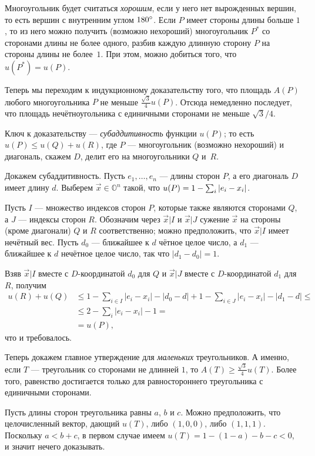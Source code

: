 Многоугольник будет считаться \emph{хорошим}, если у него нет вырожденных вершин,
то есть вершин с внутренним углом $180\degree$.
Если $P$ имеет стороны длины больше $1$, то из него можно получить (возможно нехороший) многоугольник $P^*$ со сторонами длины не более одного, разбив каждую длинную сторону $P$ на стороны длины не более~$1$.
При этом, можно добиться того, что $u(P^*)=u(P)$.

Теперь мы переходим к индукционному доказательству того, что площадь $A(P)$ любого многоугольника $P$ не меньше $\tfrac{\sqrt{3}}{4}u(P)$.
Отсюда немедленно последует, что площадь нечётноугольника с единичными сторонами не меньше  $\sqrt{3}/4$.

Ключ к доказательству --- \emph{субаддитивность} функции $u(P)$;
то есть $u(P)\leqslant u(Q)+u(R)$, где $P$ --- многоугольник (возможно нехороший) и диагональ, скажем $D$, делит его на многоугольники $Q$ и~$R$.

Докажем субаддитивность.
Пусть  $e_1,\dots,e_n$ --- длины сторон $P$, а его диагональ $D$ имеет длину $d$. 
Выберем $\vec x\in\mathbb{O}^n$ такой, что $u(P)\z=1-\sum_i |e_i-x_i|$.

Пусть $I$ --- множество индексов сторон $P$, которые также являются сторонами $Q$, а $J$ --- индексы сторон $R$.
Обозначим через $\vec x|I$ и $\vec x|J$ сужение $\vec x$ на стороны (кроме диагонали) $Q$ и $R$ соответственно;
можно предположить, что $\vec x|I$ имеет нечётный вес.
Пусть $d_0$ --- ближайшее к $d$ чётное целое число, а $d_1$ --- ближайшее к $d$ нечётное целое число, так что $|d_1-d_0|=1$.

Взяв $\vec x|I$ вместе с $D$-координатой $d_0$ для $Q$ и 
$\vec x|J$ вместе с $D$-координатой $d_1$ для $R$, получим
\begin{align*}
u(R)+u(Q)
&\leqslant
1-\sum_{i\in I}|e_i-x_i|-|d_0-d|
+
1-\sum_{i\in J}|e_i-x_i|-|d_1-d|
\leqslant
\\
&\leqslant2-\sum_{i}|e_i-x_i|-1=
\\
&=u(P),
\end{align*}
что и требовалось.

Теперь докажем главное утверждение для \emph{маленьких} треугольников.
А именно, если $T$ --- треугольник со сторонами не длинней $1$, то 
$A(T)\geqslant \tfrac{\sqrt{3}}{4}u(T)$.
Более того, равенство достигается только для равностороннего треугольника с единичными сторонами.

Пусть длины сторон треугольника равны $a$, $b$ и $c$.
Можно предположить, что целочисленный вектор, дающий $u(T)$, либо $(1, 0, 0)$, либо $(1, 1, 1)$.
Поскольку $a < b + c$, в первом случае имеем $u(T)=1-(1-a)-b-c<0$, и значит нечего доказывать.

